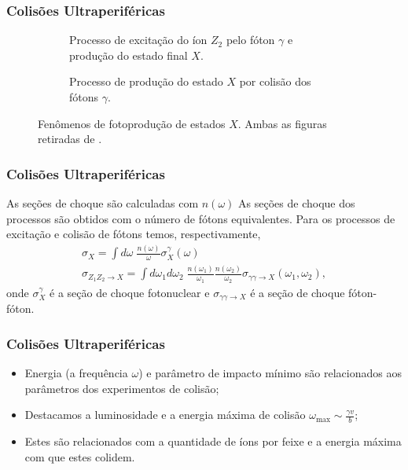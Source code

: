 \documentclass[xcolor=dvipsnames]{beamer}
\begin{document}
\begin{frame}
	\frametitle{Colisões Ultraperiféricas}
	\begin{figure}
		\begin{subfigure}[b]{0.45\textwidth}
			\centering
			
			\caption{Processo de excitação do íon $Z_2$ pelo fóton $\gamma$ e
			produção do estado final $X$.}
		\end{subfigure}
		\hspace{0.25cm}
		\begin{subfigure}[b]{0.45\textwidth}
			\centering
			
			\caption{Processo de produção do estado $X$ por colisão dos fótons
			$\gamma$.}
		\end{subfigure}
		\caption{Fenômenos de fotoprodução de estados $X$. Ambas as figuras retiradas
		de \cite{bertulani2005}.}
	\end{figure}
\end{frame}

\begin{frame}
	\frametitle{Colisões Ultraperiféricas}
	\begin{block}{As seções de choque são calculadas com $n(\omega)$}
		As seções de choque dos processos são obtidos com o número de fótons
		equivalentes. Para os processos de excitação e colisão de fótons temos,
		respectivamente,
		\begin{gather}
			\sigma _X = \int d\omega \; \frac{n(\omega)}{\omega} \sigma _X
			^\gamma (\omega) \\
			\sigma _{Z_1 Z_2 \rightarrow X} = \int d\omega _1 d\omega _2 \;
			\frac{n(\omega _1)}{\omega _1} \frac{n(\omega _2)}{\omega _2}
			\sigma_{\gamma \gamma \rightarrow X}(\omega _1, \omega _2),
		\end{gather}
		onde $\sigma _X ^\gamma$ é a seção de choque fotonuclear e $\sigma
		_{\gamma \gamma \rightarrow X}$ é a seção de choque fóton-fóton.
	\end{block}
\end{frame}

\begin{frame}
	\frametitle{Colisões Ultraperiféricas}
	\begin{itemize}
		\item Energia (a frequência $\omega$) e parâmetro de impacto mínimo
			são relacionados aos parâmetros dos experimentos de colisão;
		\item Destacamos a luminosidade e a energia máxima de colisão
			$\displaystyle \omega _\text{max} \sim \frac{\gamma v}{b}$;
		\item Estes são relacionados com a quantidade de íons por feixe e a
			energia máxima com que estes colidem.
	\end{itemize}
\end{frame}
\end{document}
